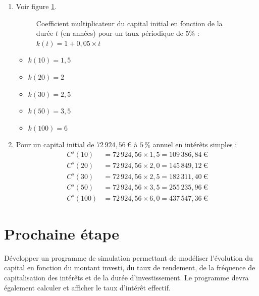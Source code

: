 \documentclass{article}
\begin{document}
\begin{enumerate}[label=\textbf{Q\arabic*.}]
    \item Voir figure \ref{fig:coefficient_multiplicateur}.
        \begin{figure}[h!]
            \centering
            \caption{Coefficient multiplicateur du capital initial en fonction de la durée \( t \) (en années) pour un taux périodique de 5\% : \( k(t) = 1 + 0,05 \times t \)}
            \label{fig:coefficient_multiplicateur}
        \end{figure}

        \begin{itemize}
            \item $k(10) = 1,5$
            \item $k(20) = 2$
            \item $k(30) = 2,5$
            \item $k(50) = 3,5$
            \item $k(100) = 6$
        \end{itemize}

    \item Pour un capital initial de \( 72\,924,\!56\ \text{€} \) à \( 5\,\% \) annuel en intérêts simples :
    \begin{align*}
        C^s(10)  &= 72\,924,\!56 \times 1,\!5   = 109\,386,\!84\ \text{€} \\[0.4em]
        C^s(20)  &= 72\,924,\!56 \times 2,\!0   = 145\,849,\!12\ \text{€} \\[0.4em]
        C^s(30)  &= 72\,924,\!56 \times 2,\!5   = 182\,311,\!40\ \text{€} \\[0.4em]
        C^s(50)  &= 72\,924,\!56 \times 3,\!5   = 255\,235,\!96\ \text{€} \\[0.4em]
        C^s(100) &= 72\,924,\!56 \times 6,\!0   = 437\,547,\!36\ \text{€}
    \end{align*}
    
\end{enumerate}

\section{Prochaine étape}  
Développer un programme de simulation permettant de modéliser l'évolution du capital en fonction du montant investi, du taux de rendement, de la fréquence de capitalisation des intérêts et de la durée d'investissement. Le programme devra également calculer et afficher le taux d'intérêt effectif.  
\end{document}

